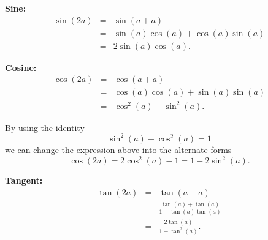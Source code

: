 \documentclass[12pt]{article}
\begin{document}
\textbf{Sine:}\\
\begin{eqnarray*}
\sin(2a)&=&\sin(a+a)\\
&=&\sin(a)\cos(a)+\cos(a)\sin(a)\\
&=&2\sin(a)\cos(a).
\end{eqnarray*}

\textbf{Cosine:}
\begin{eqnarray*}
\cos(2a)&=&\cos(a+a)\\
&=&\cos(a)\cos(a)+\sin(a)\sin(a)\\
&=&\cos^2(a)-\sin^2(a).
\end{eqnarray*}

By using the identity $$\sin^2(a)+\cos^2(a)=1$$ we can change the expression above into the alternate forms
$$\cos(2a)=2\cos^2(a)-1 = 1-2\sin^2(a).$$

\textbf{Tangent:}
\begin{eqnarray*}
\tan(2a)&=&\tan(a+a)\\
&=&\frac{\tan(a)+\tan(a)}{1-\tan(a)\tan(a)}\\
&=&\frac{2\tan(a)}{1-\tan^2(a)}.
\end{eqnarray*}
\end{document}
